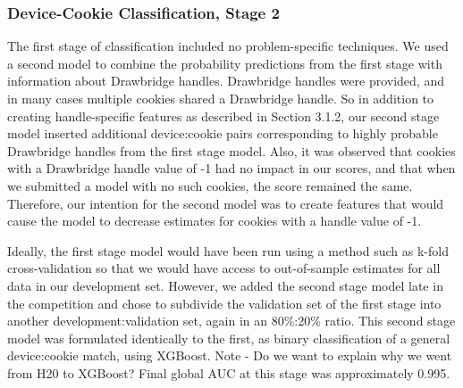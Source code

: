 \documentclass[9pt, journal]{IEEEtran}
\begin{document}


\subsubsection{Device-Cookie Classification, Stage 2}
The first stage of classification included no problem-specific techniques.
We used a second model to combine the probability predictions from the first stage with information about Drawbridge handles.
Drawbridge handles were provided, and in many cases multiple cookies shared a Drawbridge handle. 
So in addition to creating handle-specific features as described in Section 3.1.2, our second stage model inserted additional device:cookie pairs corresponding to highly probable Drawbridge handles from the first stage model. 
Also, it was observed that cookies with a Drawbridge handle value of -1 had no impact in our scores, and that when we submitted a model with no such cookies, the score remained the same.
Therefore, our intention for the second model was to create features that would cause the model to decrease estimates for cookies with a handle value of -1.

Ideally, the first stage model would have been run using a method such as k-fold cross-validation so that we would have access to out-of-sample estimates for all data in our development set.
However, we added the second stage model late in the competition and chose to subdivide the validation set of the first stage into another development:validation set, again in an 80\%:20\% ratio.
This second stage model was formulated identically to the first, as binary classification of a general device:cookie match, using XGBoost. Note - Do we want to explain why we went from H20 to XGBoost?
Final global AUC at this stage was approximately 0.995. 
\end{document}
